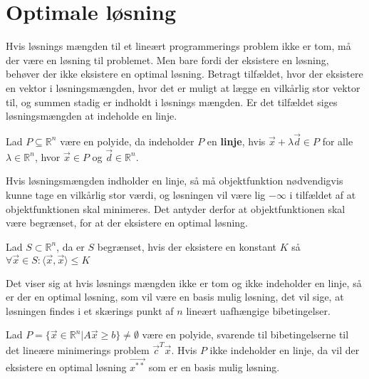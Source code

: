 \section{Optimale løsning}
\label{sec:eksistens}
Hvis løsnings mængden til et lineært programmerings problem ikke er tom, må der være en løsning til problemet.
Men bare fordi der eksistere en løsning, behøver der ikke eksistere en optimal løsning. 
Betragt tilfældet, hvor der eksistere en vektor i løsningsmængden, hvor det er muligt at lægge en vilkårlig stor vektor til, og summen stadig er indholdt i løsnings mængden.
Er det tilfældet siges løsningsmængden at indeholde en linje.
\begin{defn}[Linje]
Lad $P\subseteq \mathds{R}^n $ være en polyide, da indeholder $P$ en \textbf{linje}, hvis $\vec{x}+\lambda\vec{d} \in P$ for alle $\lambda \in \mathds{R}^n$, hvor $\vec{x}\in P$ og $\vec{d} \in \mathds{R}^n$.
\end{defn}
Hvis løsningsmængden indholder en linje, så må objektfunktion nødvendigvis kunne tage en vilkårlig stor værdi, og løsningen vil være lig $-\infty$ i tilfældet af at objektfunktionen skal minimeres. 
Det antyder derfor at objektfunktionen skal være begrænset, for at der eksistere en optimal løsning.
\begin{defn} [Begrænset]
Lad $S \subset \mathds{R}^n$, da er $S$ begrænset, hvis der eksistere en konstant $K$ så $\forall \vec{x} \in S: \langle \vec{x}, \vec{x} \rangle \leq K$
\end{defn}
Det viser sig at hvis løsnings mængden ikke er tom og ikke indeholder en linje, så er der en optimal løsning, som vil være en basis mulig løsning, det vil sige, at løsningen findes i et skærings punkt af $n$ lineært uafhængige bibetingelser.
\begin{stn}
Lad $P=\{\vec{x} \in \mathds{R}^n| A \vec{x} \geq b \} \neq \emptyset$ være en polyide, svarende til bibetingelserne til det lineære minimerings problem $\vec{c}^T\vec{x}$. Hvis $P$ ikke indeholder en linje, da vil der eksistere en optimal løsning $\vec{x^{**}}$ som er en basis mulig løsning.
\label{stn:eksistens}
\end{stn}

